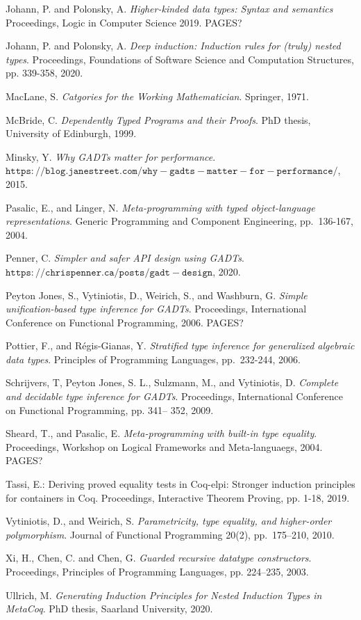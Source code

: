 \documentclass[9pt]{entcs}
\begin{document}
\begin{thebibliography}{10}
 Johann, P. and Polonsky, A. {\em Higher-kinded data
  types: Syntax and semantics} Proceedings, Logic in Computer Science
  2019. {\color{red} PAGES?}

 Johann, P. and Polonsky, A. {\em Deep induction:
  Induction rules for (truly) nested types}.  Proceedings, Foundations
  of Software Science and Computation Structures, pp. 339-358, 2020.

 MacLane, S. {\em Catgories for the Working
  Mathematician}. Springer, 1971.

 McBride, C. {\em Dependently Typed Programs and their
  Proofs}. PhD thesis, University of Edinburgh, 1999.

 Minsky, Y.  {\em Why {GADT}s matter for performance}.
  $\mathtt{https://blog.janestreet.com/why-gadts-matter-for-performance/}$,
  2015.

 Pasalic, E., and Linger, N.  {\em Meta-programming with
  typed object-language representations}.  Generic Programming and
  Component Engineering, pp.~136-167, 2004.

 Penner, C.  {\em Simpler and safer {API} design using
  {GADT}s}.  $\mathtt{https://chrispenner.ca/posts/gadt-design}$,
  2020.

 Peyton Jones, S., Vytiniotis, D., Weirich, S., and
  Washburn, G. {\em Simple unification-based type inference for
    GADTs}. Proceedings, International Conference on Functional
  Programming, 2006. {\color{red} PAGES?}

 Pottier, F., and R{\'e}gis-Gianas, Y.  {\em Stratified
  type inference for generalized algebraic data types}.  Principles of
  Programming Languages, pp.~232-244, 2006.

 Schrijvers, T, Peyton Jones, S. L., Sulzmann, M., and
  Vytiniotis, D. {\em Complete and decidable type inference for
    GADTs}. Proceedings, International Conference on Functional
  Programming, pp. 341– 352, 2009.

 Sheard, T., and Pasalic, E. {\em Meta-programming with
  built-in type equality}. Proceedings, Workshop on Logical Frameworks
  and Meta-languaegs, 2004. {\color{red} PAGES?}

 Tassi, E.: Deriving proved equality tests in Coq-elpi:
  Stronger induction principles for containers in Coq. Proceedings,
  Interactive Theorem Proving, pp. 1-18, 2019.
  
 Vytiniotis, D., and Weirich, S.  {\em Parametricity,
  type equality, and higher-order polymorphism}.  Journal of
  Functional Programming 20(2), pp.~175--210, 2010.

 Xi, H., Chen, C. and Chen, G. {\em Guarded recursive
  datatype constructors}. Proceedings, Principles of Programming
  Languages, pp. 224–235, 2003.

 Ullrich, M. {\em Generating Induction Principles for
Nested Induction Types in MetaCoq}. PhD thesis, Saarland University,
  2020.  
  
\end{thebibliography}
\end{document}
